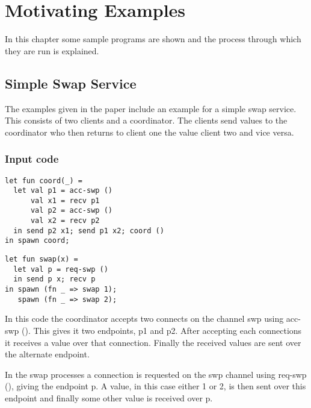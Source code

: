 \chapter{Motivating Examples} \label{examplesChapt}

In this chapter some sample programs are shown and the process through which they are run is explained. 

\section{Simple Swap Service}

The examples given in the paper \cite{paper1} include an example for a simple swap service. This consists of two clients and a coordinator. The clients send values to the coordinator who then returns to client one the value client two and vice versa.

\subsection{Input code}

\begin{minipage}{.45\textwidth}
\begin{lstlisting}[backgroundcolor=\color{white},numbers=none]
let fun coord(_) =
  let val p1 = acc-swp ()
      val x1 = recv p1
      val p2 = acc-swp ()
      val x2 = recv p2
  in send p2 x1; send p1 x2; coord ()
in spawn coord;
\end{lstlisting}
\end{minipage}
\hfill
\begin{minipage}{.45\textwidth}
\begin{lstlisting}[backgroundcolor=\color{white},numbers=none]
let fun swap(x) =
  let val p = req-swp ()
  in send p x; recv p
in spawn (fn _ => swap 1);
   spawn (fn _ => swap 2);
\end{lstlisting}
\vspace{2em}
\end{minipage} 

In this code the coordinator accepts two connects on the channel swp using acc-swp (). This gives it two endpoints, p1 and p2. After accepting each connections it receives a value over that connection. Finally the received values are sent over the alternate endpoint. 

In the swap processes a connection is requested on the swp channel using req-swp (), giving the endpoint p. A value, in this case either 1 or 2, is then sent over this endpoint and finally some other value is received over p. 

